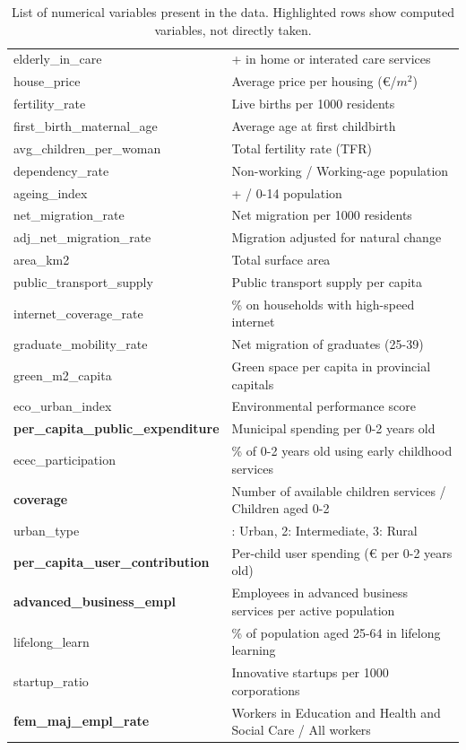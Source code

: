 \begin{table}[H]
{\begin{tabularx}{1.1\textwidth}{ >{\hsize=0.7\hsize}X >{\hsize=1.3\hsize}X}
    elderly\_in\_care & 65+ in home or interated care services\\
    house\_price & Average price per housing (€/$m^2$)\\
    fertility\_rate & Live births per 1000 residents\\
    first\_birth\_maternal\_age & Average age at first childbirth\\
    avg\_children\_per\_woman & Total fertility rate (TFR)\\
    dependency\_rate & Non-working / Working-age population\\
    ageing\_index & 65+ / 0-14 population\\
    net\_migration\_rate & Net migration per 1000 residents\\
    adj\_net\_migration\_rate & Migration adjusted for natural change\\
    area\_km2 & Total surface area\\
    public\_transport\_supply & Public transport supply per capita\\
    internet\_coverage\_rate & \% on households with high-speed internet\\
    graduate\_mobility\_rate & Net migration of graduates (25-39)\\
    green\_m2\_capita & Green space per capita in provincial capitals\\
    eco\_urban\_index & Environmental performance score\\
    \textbf{per\_capita\_public\_expenditure} & Municipal spending per 0-2 years old\\
    ecec\_participation & \% of 0-2 years old using early childhood services\\
    \textbf{coverage} & Number of available children services / Children aged 0-2\\
    urban\_type & 1: Urban, 2: Intermediate, 3: Rural\\
    \textbf{per\_capita\_user\_contribution} & Per-child user spending (€ per 0-2 years old)\\
    \textbf{advanced\_business\_empl} & Employees in advanced business services per active population\\
    lifelong\_learn & \% of population aged 25-64 in lifelong learning\\
    startup\_ratio & Innovative startups per 1000 corporations\\
    \textbf{fem\_maj\_empl\_rate} & Workers in Education and Health and Social Care / All workers\\
    \hline
    \end{tabularx}
    }
    \caption{List of numerical variables present in the data. Highlighted rows show computed variables, not directly taken.}
    \label{tb:variables_list}
\end{table}

